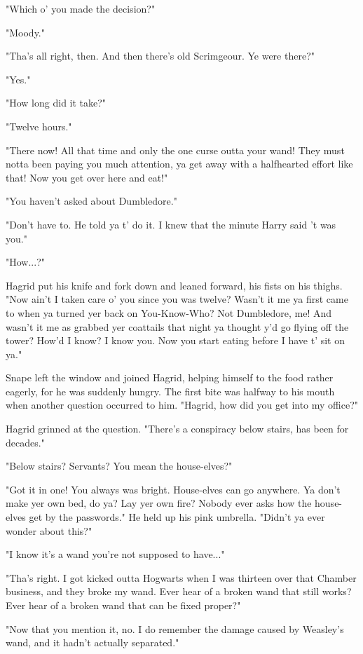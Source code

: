 "Which o' you made the decision?"

"Moody."

"Tha's all right, then. And then there's old Scrimgeour. Ye were there?"

"Yes."

"How long did it take?"

"Twelve hours."

"There now! All that time and only the one curse outta your wand! They must notta been paying you much attention, ya get away with a halfhearted effort like that! Now you get over here and eat!"

"You haven't asked about Dumbledore."

"Don't have to. He told ya t' do it. I knew that the minute Harry said 't was you."

"How...?"

Hagrid put his knife and fork down and leaned forward, his fists on his thighs. "Now ain't I taken care o' you since you was twelve? Wasn't it me ya first came to when ya turned yer back on You-Know-Who? Not Dumbledore, me! And wasn't it me as grabbed yer coattails that night ya thought y'd go flying off the tower? How'd I know? I know you. Now you start eating before I have t' sit on ya."

Snape left the window and joined Hagrid, helping himself to the food rather eagerly, for he was suddenly hungry. The first bite was halfway to his mouth when another question occurred to him. "Hagrid, how did you get into my office?"

Hagrid grinned at the question. "There's a conspiracy below stairs, has been for decades."

"Below stairs? Servants? You mean the house-elves?"

"Got it in one! You always was bright. House-elves can go anywhere. Ya don't make yer own bed, do ya? Lay yer own fire? Nobody ever asks how the house-elves get by the passwords." He held up his pink umbrella. "Didn't ya ever wonder about this?"

"I know it's a wand you're not supposed to have..."

"Tha's right. I got kicked outta Hogwarts when I was thirteen over that Chamber business, and they broke my wand. Ever hear of a broken wand that still works? Ever hear of a broken wand that can be fixed proper?"

"Now that you mention it, no. I do remember the damage caused by Weasley's wand, and it hadn't actually separated."

